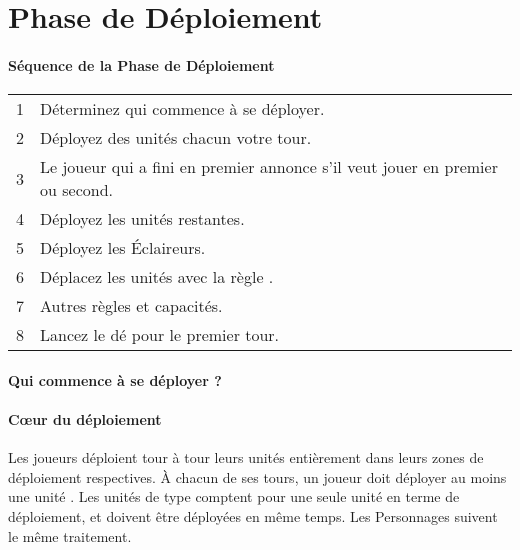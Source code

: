
\hypertarget{deploymentphase}{\part{Phase de Déploiement}}

\subsection{Séquence de la Phase de Déploiement}

\hspace*{0.3cm}
\begin{tabular}{c|m{14cm}}
1 & Déterminez qui commence à se déployer. \tabularnewline
2 & Déployez des unités chacun votre tour. \tabularnewline
3 & Le joueur qui a fini en premier annonce s'il veut jouer en premier ou second. \tabularnewline
4 & Déployez les unités restantes. \tabularnewline
5 & Déployez les Éclaireurs. \tabularnewline
6 & Déplacez les unités avec la règle \vanguard{}. \tabularnewline
7 & Autres règles et capacités. \tabularnewline
8 & Lancez le dé pour le premier tour. \tabularnewline
\end{tabular}

\hypertarget{whodeploysfirst}{\subsection{Qui commence à se déployer ?}}


\hypertarget{deployingunits}{\subsection{Cœur du déploiement}}

Les joueurs déploient tour à tour leurs unités entièrement dans leurs zones de déploiement respectives. À chacun de ses tours, un joueur doit déployer au moins une unité . Les unités de type \warmachine{} comptent pour une seule unité en terme de déploiement, et doivent être déployées en même temps. Les Personnages suivent le même traitement. 

